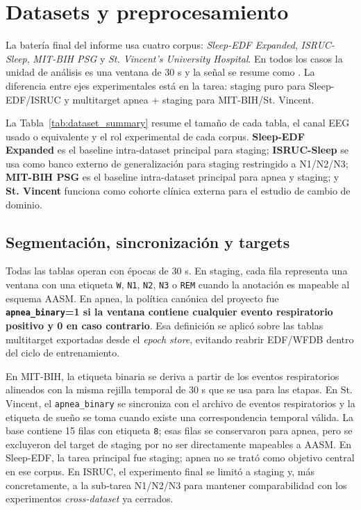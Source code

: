 \section{Datasets y preprocesamiento}

La bater\'ia final del informe usa cuatro corpus: \emph{Sleep-EDF Expanded}, \emph{ISRUC-Sleep}, \emph{MIT-BIH PSG} y \emph{St. Vincent's University Hospital}. En todos los casos la unidad de an\'alisis es una ventana de 30 s y la se\~nal se resume como . La diferencia entre ejes experimentales est\'a en la tarea: staging puro para Sleep-EDF/ISRUC y multitarget apnea + staging para MIT-BIH/St. Vincent.



La Tabla~\ref{tab:dataset_summary} resume el tama\~no de cada tabla, el canal EEG usado o equivalente y el rol experimental de cada corpus. \textbf{Sleep-EDF Expanded} es el baseline intra-dataset principal para staging; \textbf{ISRUC-Sleep} se usa como banco externo de generalizaci\'on para staging restringido a N1/N2/N3; \textbf{MIT-BIH PSG} es el baseline intra-dataset principal para apnea y staging; y \textbf{St. Vincent} funciona como cohorte cl\'inica externa para el estudio de cambio de dominio.

\subsection{Segmentaci\'on, sincronizaci\'on y targets}

Todas las tablas operan con \'epocas de 30 s. En staging, cada fila representa una ventana con una etiqueta \texttt{W}, \texttt{N1}, \texttt{N2}, \texttt{N3} o \texttt{REM} cuando la anotaci\'on es mapeable al esquema AASM. En apnea, la pol\'itica can\'onica del proyecto fue \textbf{\texttt{apnea\_binary}=1 si la ventana contiene cualquier evento respiratorio positivo y 0 en caso contrario}. Esa definici\'on se aplic\'o sobre las tablas multitarget exportadas desde el \emph{epoch store}, evitando reabrir EDF/WFDB dentro del ciclo de entrenamiento.

En MIT-BIH, la etiqueta binaria se deriva a partir de los eventos respiratorios alineados con la misma rejilla temporal de 30 s que se usa para las etapas. En St. Vincent, el \texttt{apnea\_binary} se sincroniza con el archivo de eventos respiratorios y la etiqueta de sue\~no se toma cuando existe una correspondencia temporal v\'alida. La base contiene 15 filas con etiqueta \texttt{8}; esas filas se conservaron para apnea, pero se excluyeron del target de staging por no ser directamente mapeables a AASM. En Sleep-EDF, la tarea principal fue staging; apnea no se trat\'o como objetivo central en ese corpus. En ISRUC, el experimento final se limit\'o a staging y, m\'as concretamente, a la sub-tarea N1/N2/N3 para mantener comparabilidad con los experimentos \emph{cross-dataset} ya cerrados.

